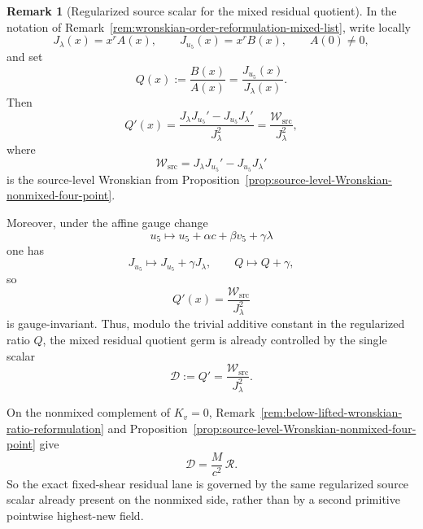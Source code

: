\documentclass[11pt,a4paper]{amsart}
\theoremstyle{plain}
\theoremstyle{definition}
\newtheorem{remark}[theorem]{Remark}
\begin{document}
\begin{remark}[Regularized source scalar for the mixed residual quotient]
\label{rem:regularized-source-scalar-mixed-residual}
In the notation of Remark~\ref{rem:wronskian-order-reformulation-mixed-list},
write locally
\[
J_\lambda(x)=x^rA(x),
\qquad
J_{u_5}(x)=x^rB(x),
\qquad
A(0)\neq 0,
\]
and set
\[
Q(x):=\frac{B(x)}{A(x)}=\frac{J_{u_5}(x)}{J_\lambda(x)}.
\]
Then
\[
Q'(x)
=
\frac{J_\lambda J_{u_5}'-J_{u_5}J_\lambda'}{J_\lambda^2}
=
\frac{\mathcal W_{\mathrm{src}}}{J_\lambda^2},
\]
where
\[
\mathcal W_{\mathrm{src}}
=
J_\lambda J_{u_5}'-J_{u_5}J_\lambda'
\]
is the source-level Wronskian from
Proposition~\ref{prop:source-level-Wronskian-nonmixed-four-point}.

Moreover, under the affine gauge change
\[
u_5\longmapsto u_5+\alpha c+\beta v_5+\gamma\lambda
\]
one has
\[
J_{u_5}\longmapsto J_{u_5}+\gamma J_\lambda,
\qquad
Q\longmapsto Q+\gamma,
\]
so
\[
Q'(x)
=
\frac{\mathcal W_{\mathrm{src}}}{J_\lambda^2}
\]
is gauge-invariant. Thus, modulo the trivial additive constant in the
regularized ratio $Q$, the mixed residual quotient germ is already controlled
by the single scalar
\[
\mathcal D:=Q'=\frac{\mathcal W_{\mathrm{src}}}{J_\lambda^2}.
\]

On the nonmixed complement of $K_v=0$,
Remark~\ref{rem:below-lifted-wronskian-ratio-reformulation} and
Proposition~\ref{prop:source-level-Wronskian-nonmixed-four-point} give
\[
\mathcal D
=
\frac{M}{c^2}\,\mathcal R.
\]
So the exact fixed-shear residual lane is governed by the same regularized
source scalar already present on the nonmixed side, rather than by a second
primitive pointwise highest-new field.
\end{remark}
\end{document}
